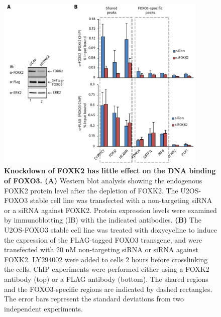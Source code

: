 \begin{figure}[!ht]
    \centering
    \includegraphics[width=0.9\textwidth]{chapter3/figures_foxo3/fig49.pdf}
    \caption[Knockdown of FOXK2 has little effect on the DNA binding of FOXO3]{\textbf{Knockdown of FOXK2 has little effect on the DNA binding of FOXO3. (A)} Western blot analysis showing the endogenous FOXK2 protein level after the depletion of FOXK2. The U2OS-FOXO3 stable cell line was transfected with a non-targeting siRNA or a siRNA against FOXK2. Protein expression levels were examined by immunoblotting (IB) with the indicated antibodies. \textbf{(B)} The U2OS-FOXO3 stable cell line was treated with doxycycline to induce the expression of the FLAG-tagged FOXO3 transgene, and were transfected with 20 nM non-targeting siRNA or siRNA against FOXK2. LY294002 were added to cells 2 hours before crosslinking the cells. ChIP experiments were performed either using a FOXK2 antibody (top) or a FLAG antibody (bottom). The shared regions and the FOXO3-specific regions are indicated by dashed rectangles. The error bars represent the standard deviations from two independent experiments.}
    \label{fig:fig49}
\end{figure}

